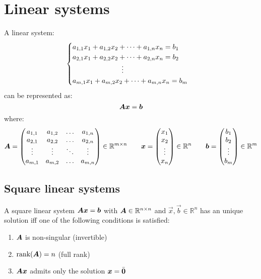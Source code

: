 \section{Linear systems}

A linear system:
\begin{equation*}
    \begin{cases}
        a_{1,1}x_1 + a_{1,2}x_2 + \dots + a_{1,n}x_n = b_1\\
        a_{2,1}x_1 + a_{2,2}x_2 + \dots + a_{2,n}x_n = b_2\\
        \hspace*{7em} \vdots \\
        a_{m,1}x_1 + a_{m,2}x_2 + \dots + a_{m,n}x_n = b_m\\
    \end{cases}
\end{equation*}
can be represented as:
\[ {\bm{A}}{\bm{x}} = {\bm{b}} \]
where:
\[
    {\bm{A}} = 
    \begin{pmatrix}
        a_{1,1} & a_{1, 2} & \hdots & a_{1,n} \\
        a_{2,1} & a_{2, 2} & \hdots & a_{2,n} \\
        \vdots  & \vdots   & \ddots & \vdots  \\
        a_{m,1} & a_{m, 2} & \hdots & a_{m,n}
    \end{pmatrix} \in \mathbb{R}^{m \times n}
    \hspace*{2em}
    {\bm{x}} = 
    \begin{pmatrix}
        x_1 \\
        x_2 \\ 
        \vdots \\
        x_n
    \end{pmatrix} \in \mathbb{R}^n
    \hspace*{2em}
    {\bm{b}} = 
    \begin{pmatrix}
        b_1 \\
        b_2 \\ 
        \vdots \\
        b_m
    \end{pmatrix} \in \mathbb{R}^m
\]
    


\subsection{Square linear systems}
A square linear system ${\bm{A}}{\bm{x}} = {\bm{b}}$ with ${\bm{A}} \in \mathbb{R}^{n \times n}$ and $\vec{x}, \vec{b} \in \mathbb{R}^n$
has an unique solution iff one of the following conditions is satisfied:
\begin{enumerate}
    \item ${\bm{A}}$ is non-singular (invertible)
    \item $\text{rank}({\bm{A}}) = n$ (full rank)
    \item ${\bm{A}}{\bm{x}}$ admits only the solution ${\bm{x}} = \bar{{\bm{0}}}$
\end{enumerate}

